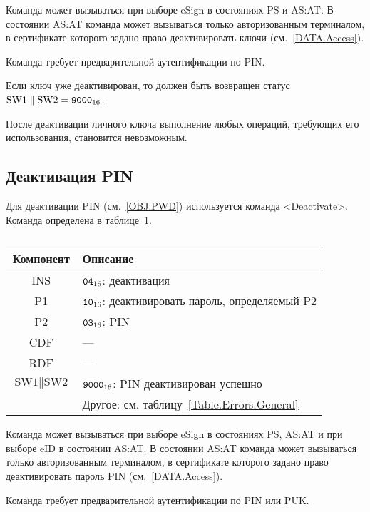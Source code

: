 Команда может вызываться при выборе eSign в состояниях 
PS и AS:AT. В состоянии AS:AT команда может вызываться 
только авторизованным терминалом, в сертификате которого задано право
деактивировать ключи (см.~\ref{DATA.Access}).

Команда требует предварительной аутентификации по PIN. 

Если ключ уже деактивирован, то должен быть возвращен статус
$\text{SW1} \parallel \text{SW2} = \texttt{9000}_{16}$.

После деактивации личного ключа выполнение любых операций, 
требующих его использования, становится невозможным.

\subsection{Деактивация PIN}
\label{Oper.Descr.DeactivatePIN} 

Для деактивации PIN (см.~\ref{OBJ.PWD}) используется команда <Deactivate>.
Команда определена в таблице~\ref{Table.Oper.DeactivatePINCmd}.

\begin{table}[hbt]
\caption{}\label{Table.Oper.DeactivatePINCmd}
\begin{tabular}{|c|p{14cm}|}
\hline
Компонент & Описание \\
\hline
\hline
INS & $\texttt{04}_{16}$: деактивация\\
\hline
P1 & $\texttt{10}_{16}$: деактивировать пароль, определяемый P2\\
\hline
P2 & $\texttt{03}_{16}$: PIN \\
\hline
CDF &  --- \\
\hline 
\hline
RDF & --- \\
\hline
$\text{SW1} \parallel \text{SW2}$ & 
$\texttt{9000}_{16}$: PIN деактивирован успешно\\
\cline{2-2}
  & Другое: см. таблицу~\ref{Table.Errors.General}\\
\hline
\end{tabular}
\end{table}

Команда может вызываться при выборе eSign в состояниях 
PS, AS:AT и при выборе eID в состоянии AS:AT. 
В состоянии AS:AT команда может вызываться только авторизованным терминалом, 
в сертификате которого задано право деактивировать пароль PIN
(см.~\ref{DATA.Access}).

Команда требует предварительной аутентификации по PIN или PUK. 


